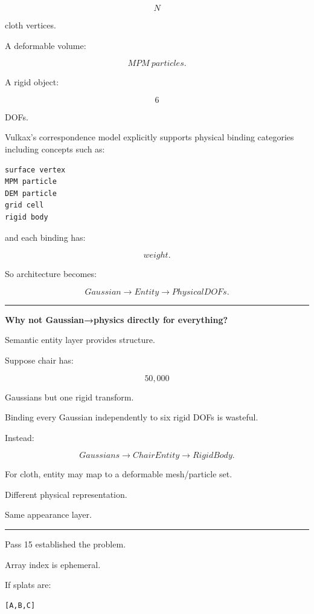 \[
N
\]

cloth vertices.

A deformable volume:

\[
MPM\ particles.
\]

A rigid object:

\[
6
\]

DOFs.

Vulkax's correspondence model explicitly supports physical binding categories including concepts such as:

\protect{}\label{ijumvh}%
\begin{verbatim}
surface vertex
MPM particle
DEM particle
grid cell
rigid body
\end{verbatim}

and each binding has:

\[
weight.
\]

So architecture becomes:

\[
Gaussian
\rightarrow
Entity
\rightarrow
PhysicalDOFs.
\]

\begin{center}\rule{0.5\linewidth}{0.5pt}\end{center}

\textbf{Why not Gaussian→physics directly for everything?}

Semantic entity layer provides structure.

Suppose chair has:

\[
50,000
\]

Gaussians but one rigid transform.

Binding every Gaussian independently to six rigid DOFs is wasteful.

Instead:

\[
Gaussians
\rightarrow
ChairEntity
\rightarrow
RigidBody.
\]

For cloth, entity may map to a deformable mesh/particle set.

Different physical representation.

Same appearance layer.

\begin{center}\rule{0.5\linewidth}{0.5pt}\end{center}

Pass 15 established the problem.

Array index is ephemeral.

If splats are:

\protect{}\label{f90y7n}%
\begin{verbatim}
[A,B,C]
\end{verbatim}

